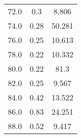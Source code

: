 \begin{table}[H]
\begin{tabular}{c c c}
        72.0  &  0.3  &  8.806  \\
        74.0  &  0.28  &  50.281  \\
        76.0  &  0.25  &  10.613  \\
        78.0  &  0.22  &  10.332  \\
        80.0  &  0.22  &  81.3  \\
        82.0  &  0.25  &  9.567  \\
        84.0  &  0.42  &  13.522  \\
        86.0  &  0.83  &  24.251  \\
        88.0  &  0.52  &  9.417  \\
        \bottomrule
    \end{tabular}
\end{table}
\newpage

